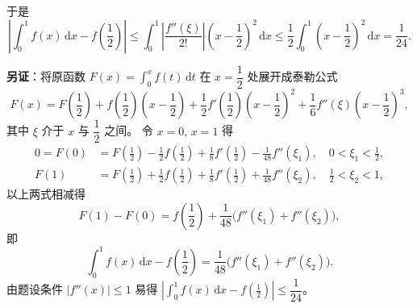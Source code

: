 \documentclass[a4paper,11pt]{ctexart}
\newcommand{\dd}{\,\mathrm{d}}
\begin{document}
\begin{enumerate}[label=\arabic*., start=19, leftmargin=2em, itemsep=0.9em, topsep=0.45em]
  于是
  \[
    \left|\int_0^1 f(x)\dd x-f\!\left(\frac{1}{2}\right)\right|
    \le\int_0^1\left|\frac{f''(\xi)}{2!}\right|\left(x-\frac{1}{2}\right)^2\dd x
    \le\frac{1}{2}\int_0^1\left(x-\frac{1}{2}\right)^2\dd x=\frac{1}{24}.
  \]

  \textbf{另证}：将原函数 $F(x)=\displaystyle\int_0^x f(t)\dd t$ 在 $x=\dfrac{1}{2}$ 处展开成泰勒公式
  \[
    F(x)=F\!\left(\frac{1}{2}\right)+f\!\left(\frac{1}{2}\right)\left(x-\frac{1}{2}\right)+\frac{1}{2}f'\!\left(\frac{1}{2}\right)\left(x-\frac{1}{2}\right)^2+\frac{1}{6}f''(\xi)\left(x-\frac{1}{2}\right)^3,
  \]
  其中 $\xi$ 介于 $x$ 与 $\dfrac{1}{2}$ 之间。
  令 $x=0,\,x=1$ 得
  \begin{align*}
    0=F(0) &= F\!\left(\frac{1}{2}\right)-\frac{1}{2}f\!\left(\frac{1}{2}\right)+\frac{1}{8}f'\!\left(\frac{1}{2}\right)-\frac{1}{48}f''(\xi_1),\quad 0<\xi_1<\frac{1}{2}, \\
    F(1) &= F\!\left(\frac{1}{2}\right)+\frac{1}{2}f\!\left(\frac{1}{2}\right)+\frac{1}{8}f'\!\left(\frac{1}{2}\right)+\frac{1}{48}f''(\xi_2),\quad \frac{1}{2}<\xi_2<1,
  \end{align*}
  以上两式相减得
  \[
    F(1)-F(0)=f\!\left(\frac{1}{2}\right)+\frac{1}{48}\bigl(f''(\xi_1)+f''(\xi_2)\bigr),
  \]
  即
  \[
    \int_0^1 f(x)\dd x-f\!\left(\frac{1}{2}\right)=\frac{1}{48}\bigl(f''(\xi_1)+f''(\xi_2)\bigr).
  \]
  由题设条件 $|f''(x)|\le 1$ 易得 $\left|\displaystyle\int_0^1 f(x)\dd x-f\!\left(\frac{1}{2}\right)\right|\le\dfrac{1}{24}$。
\end{enumerate}
\end{document}
